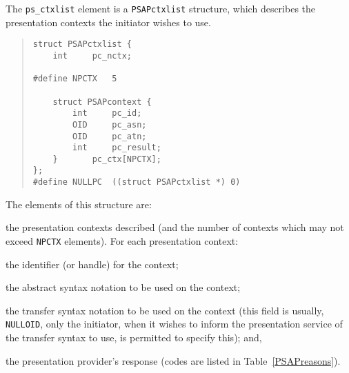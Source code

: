 The \verb"ps_ctxlist" element is a \verb"PSAPctxlist" structure,
which describes the presentation contexts the initiator wishes to use.
\begin{quote}\small\begin{verbatim}
struct PSAPctxlist {
    int     pc_nctx;

#define NPCTX   5

    struct PSAPcontext {
        int     pc_id;
        OID     pc_asn;
        OID     pc_atn;
        int     pc_result;
    }       pc_ctx[NPCTX];
};
#define NULLPC  ((struct PSAPctxlist *) 0)
\end{verbatim}\end{quote}
The elements of this structure are:\label{PSAPctxlist}
\begin{describe}
\item[\verb"pc\_ctx"/\verb"pc\_nctx":] the presentation contexts described
(and the number of contexts which may not exceed \verb"NPCTX" elements).
For each presentation context:
    \begin{describe}
    \item[\verb"pc\_id":] the identifier (or handle) for the context;

    \item[\verb"pc\_asn":] the abstract syntax notation to be used on the
	context;

    \item[\verb"pc\_atn":] the transfer syntax notation to be used on the
	context (this field is usually, \verb"NULLOID", only the initiator,
	when it wishes to inform the presentation service of the transfer
	syntax to use, is permitted to specify this); and,

    \item[\verb"pc\_result":] the presentation provider's response
	(codes are listed in Table~\ref{PSAPreasons}).
    \end{describe}
\end{describe}


